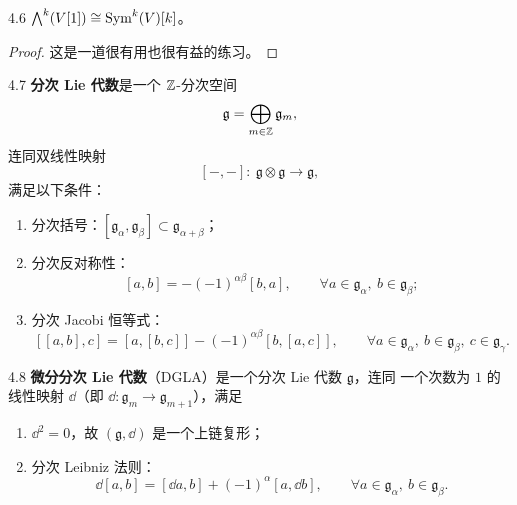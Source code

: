 \begin{wprop}{4.6}
  $\bigwedge^{k}(V[1])\cong\operatorname{Sym}^{k}(V)[k]$。
\end{wprop}

\begin{proof}
  这是一道很有用也很有益的练习。
\end{proof}

\begin{wdefn}{4.7}
  \textbf{分次 Lie 代数}是一个 $\mathbb{Z}$-分次空间
  \[
    \mathfrak g=\bigoplus_{m\in\mathbb{Z}}\mathfrak g_m,
  \]
  连同双线性映射
  \[
    [-,-]:\ \mathfrak g\otimes\mathfrak g\longrightarrow\mathfrak g,
  \]
  满足以下条件：
  \begin{enumerate}[label=\arabic*),leftmargin=1.8em,itemsep=0.25em]
    \item 分次括号：$[\mathfrak g_\alpha,\mathfrak g_\beta]
          \subset\mathfrak g_{\alpha+\beta}$；
    \item 分次反对称性：
          \[
            [a,b]=-(-1)^{\alpha\beta}[b,a],
            \qquad\forall a\in\mathfrak g_\alpha,\ b\in\mathfrak g_\beta;
          \]
    \item 分次 Jacobi 恒等式：
          \[
            [[a,b],c]=[a,[b,c]]-(-1)^{\alpha\beta}[b,[a,c]],
            \qquad\forall a\in\mathfrak g_\alpha,\ b\in\mathfrak g_\beta,\
            c\in\mathfrak g_\gamma.
          \]
  \end{enumerate}
\end{wdefn}


\begin{wdefn}{4.8}
  \textbf{微分分次 Lie 代数}（DGLA）是一个分次 Lie 代数 $\mathfrak g$，连同
  一个次数为 $1$ 的线性映射 $\dd$（即 $\dd:\mathfrak g_m\to\mathfrak g_{m+1}$），满足
  \begin{enumerate}[label=\arabic*),leftmargin=1.8em,itemsep=0.25em]
    \item $\dd^2=0$，故 $(\mathfrak g,\dd)$ 是一个上链复形；
    \item 分次 Leibniz 法则：
          \[
            \dd[a,b]=[\dd a,b]+(-1)^{\alpha}[a,\dd b],
            \qquad\forall a\in\mathfrak g_\alpha,\ b\in\mathfrak g_\beta.
          \]
  \end{enumerate}
\end{wdefn}


